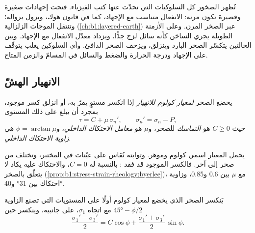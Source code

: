 تُظهر الصخور كل السلوكيات التي تحدّث عنها كتب الفيزياء. فتحت إجهادات صغيرة وقصيرة تكون مرنة: الانفعال متناسب مع الإجهاد، كما في قانون هوك، ويزول بزواله؛ وتنتقل الموجات الزلزالية (\cref{ch:b1:layered-earth}) عبر الصخر المرن. وعلى الأزمنة الطويلة يجري  الساخن كأنه سائل لزج جدًّا، ويزداد معدّل الانفعال مع الإجهاد. وبين الحالتين يتكسّر الصخر البارد وينزلق، ويزحف الصخر الدافئ. وأي السلوكين يغلب يتوقّف على الإجهاد ودرجة الحرارة والضغط والسائل في المسامّ والزمن المتاح.

\subsection*{الانهيار الهشّ}

\begin{definition}\label{def:b1:stress-strain-rheology:coulomb}
يخضع الصخر \emph{لمعيار كولوم للانهيار} إذا انكسر مستوٍ يمرّ به، أو انزلق كسر موجود، بمجرد أن يبلغ على ذلك المستوى
\[
  \tau = C + \mu\,\sigma_n' , \qquad \sigma_n' = \sigma_n - P ,
\]
حيث $C \ge 0$ هو \emph{التماسك} للصخر، و$\mu$ هو \emph{معامل الاحتكاك الداخلي}، و$\phi = \arctan\mu$ هي \emph{زاوية الاحتكاك الداخلي}.
\end{definition}

يحمل المعيار اسمي كولوم وموهر. وثوابته تُقاس على عيّنات في المختبر، وتختلف من صخر إلى آخر. فالكسر الموجود قد فقد : بالنسبة له $C = 0$، والاحتكاك عليه يكاد لا يتعلّق بالصخر (\cref{prop:b1:stress-strain-rheology:byerlee})، مع $\mu$ بين 0.6 و\num{0.85}، وزاوية احتكاك بين \ang{31} و\ang{40}.

\begin{theorem}\label{thm:b1:stress-strain-rheology:failure-angle}
يَنكسر الصخر الذي يخضع لمعيار كولوم أولًا على المستويات التي تصنع الزاوية $\ang{45} - \phi/2$ مع اتجاه $\sigma_1$، على جانبيه، وينكسر حين
\[
  \frac{\sigma_1' - \sigma_3'}{2} = C\cos\phi + \frac{\sigma_1' + \sigma_3'}{2}\,\sin\phi .
\]
\end{theorem}

